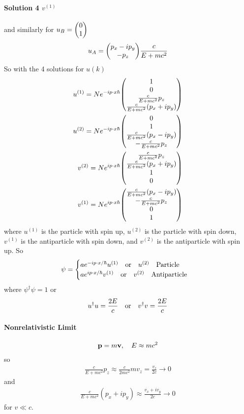 \documentclass[../main.tex]{subfiles}
\begin{document}
\paragraph*{Solution 4 $v^{(1)}$}
and similarly for $u_B = \mqty(0 \\ 1)$
\begin{align*}
    u_A = \mqty(p_x - i p_y \\ -p_z) \frac{c}{E + mc^2}
\end{align*}
So with the 4 solutions for $u(k)$ 
\begin{align*}
    u^{(1)} = N e^{-i p \cdot x \hbar} \mqty(1 \\ 0 \\ \frac{c}{E + mc^2} p_z \\ \frac{c}{E + mc^2} (p_x + i p_y)) \\
    u^{(2)} = N e^{-i p \cdot x \hbar} \mqty(0 \\ 1 \\ \frac{c}{E + mc^2} (p_x - i p_y) \\ -\frac{c}{E + mc^2} p_z) \\
    v^{(2)} = N e^{i p \cdot x \hbar} \mqty(\frac{c}{E + mc^2} p_z \\ \frac{c}{E + mc^2} (p_x + i p_y) \\ 1 \\ 0) \\
    v^{(1)} = N e^{i p \cdot x \hbar} \mqty(\frac{c}{E + mc^2} (p_x - i p_y) \\ -\frac{c}{E + mc^2} p_z \\ 0 \\ 1)
\end{align*}
where $u^{(1)}$ is the particle with spin up, $u^{(2)}$ is the particle with spin down, $v^{(1)}$ is the
antiparticle with spin down, and $v^{(2)}$ is the antiparticle with spin up.
So 
\begin{align*}
    \psi = \begin{cases}
        a e^{-i p \cdot x/\hbar} u^{(1)} \qor u^{(2)} \quad \text{Particle} \\
        a e^{i p \cdot x/\hbar} v^{(1)} \qor v^{(2)} \quad \text{Antiparticle}
    \end{cases}
\end{align*}
where $\psi^\dagger \psi = 1$ or 
\begin{align*}
    u^\dagger u = \frac{2E}{c} \qor v^\dagger v = \frac{2E}{c}
\end{align*}
\paragraph*{Nonrelativistic Limit} 
\begin{align*}
    \vb p = m \vb v, \quad E \approx mc^2
\end{align*}
so 
\begin{align*}
    \frac{c}{E + mc^2} p_z \approx \frac{c}{2mc^2} m v_z = \frac{v_z}{2c} \to 0
\end{align*}
and
\begin{align*}
    \frac{c}{E + mc^2} (p_x + i p_y) \approx \frac{v_x + i v_y}{2c} \to 0
\end{align*}
for $v \ll c$. 
\end{document}
